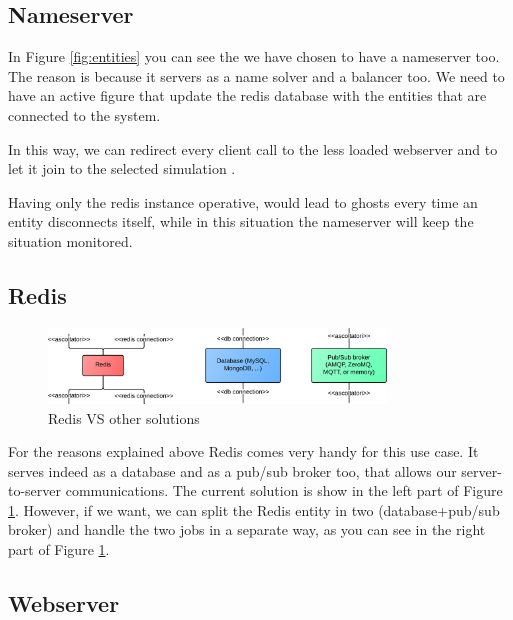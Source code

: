 \subsection{Nameserver}

In Figure \ref{fig:entities} you can see the we have chosen to have a nameserver too. The reason is because it servers as a name solver and a balancer too. We need to have an active figure that update the redis database with the entities that are connected to the system.

In this way, we can redirect every client call to the less loaded webserver and to let it join to the selected simulation .

Having only the redis instance operative, would lead to ghosts every time an entity disconnects itself, while in this situation the nameserver will keep the situation monitored.

\subsection{Redis}

\begin{figure}[H]
\centering %
\includegraphics[width=0.8\textwidth]{./img/SystemAnalysis/RedisPubSubBroker.png}
\caption{Redis VS other solutions}
\label{fig:redisVSotherSolutions}
\end{figure}

For the reasons explained above Redis comes very handy for this use case. It serves indeed as a database and as a pub/sub broker too, that allows our server-to-server communications. The current solution is show in the left part of Figure \ref{fig:redisVSotherSolutions}. However, if we want, we can split the Redis entity in two (database+pub/sub broker) and handle the two jobs in a separate way, as you can see in the right part of Figure \ref{fig:redisVSotherSolutions}.

\subsection{Webserver}

